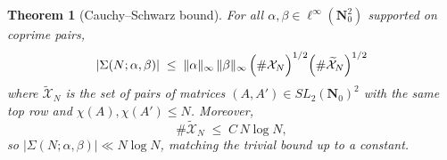 \documentclass[11pt]{article}
\newtheorem{theorem}{Theorem}[section]
\theoremstyle{definition}
\newcommand{\Nz}{\mathbf{N}_0}
\newcommand{\SLNz}{SL_2(\Nz)}
\begin{document}
\begin{theorem}[Cauchy--Schwarz bound]\label{thm:CS-bilinear}
For all $\alpha,\beta\in\ell^{\infty}(\Nz^{2})$ supported on coprime
pairs,
\begin{equation}\label{eq:CS-bilinear}
|\Sigma(N;\alpha,\beta)|\;\le\;
\|\alpha\|_{\infty}\,\|\beta\|_{\infty}\,
\Bigl(\#\mathcal{X}_{N}\Bigr)^{1/2}
\Bigl(\#\widetilde{\mathcal{X}}_{N}\Bigr)^{1/2}
\end{equation}
where $\widetilde{\mathcal{X}}_{N}$ is the set of pairs of matrices
$(A,A')\in\SLNz^{2}$ with the same top row and $\chi(A),\chi(A')\le N$.
Moreover,
\begin{equation}\label{eq:CS-saturation}
\#\widetilde{\mathcal{X}}_{N}\;\le\;C\,N\log N,
\end{equation}
so $|\Sigma(N;\alpha,\beta)|\ll N\log N$, matching the trivial bound up
to a constant.
\end{theorem}
\end{document}
